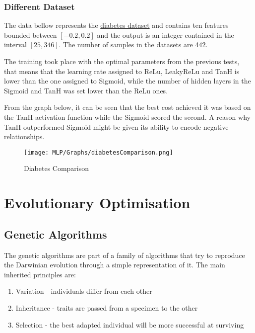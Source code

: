 \documentclass{report}
\begin{document}
\subsection{Different Dataset}
The data bellow represents the \href{https://scikit-learn.org/stable/modules/generated/sklearn.datasets.load_diabetes.html#sklearn.datasets.load_diabetes}{diabetes dataset} and contains ten features bounded between $[-0.2,0.2]$ and the output is an integer contained in the interval $[25,346]$. The number of samples in the datasets are 442.

The training took place with the optimal parameters from the previous tests, that means that the learning rate assigned to ReLu, LeakyReLu and TanH is lower than the one assigned to Sigmoid, while the number of hidden layers in the Sigmoid and TanH was set lower than the ReLu ones.

From the graph below, it can be seen that the best cost achieved it was based on the TanH activation function while the Sigmoid scored the second. A reason why TanH outperformed Sigmoid might be given its ability to encode negative relationships. 


\begin{center}
\begin{figure}[htp]
\texttt{[image: MLP/Graphs/diabetesComparison.png]}
\caption{Diabetes Comparison}
\label{diabetes}
\end{figure}
\end{center}

\chapter{Evolutionary Optimisation}


\section{Genetic Algorithms}
The genetic algorithms are part of a family of algorithms that try to reproduce the Darwinian evolution through a simple representation of it. The main inherited principles are:
\begin{enumerate}
\item Variation - individuals differ from each other
\item Inheritance - traits are passed from a specimen to the other
\item Selection - the best adapted individual will be more successful at surviving
\end{enumerate}
\end{document}
